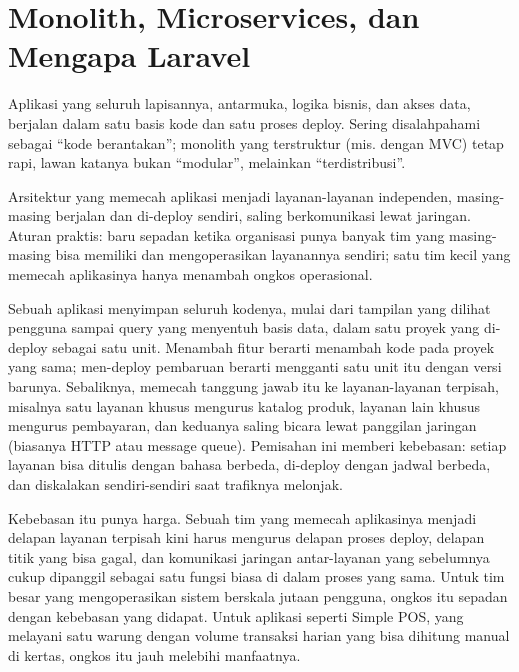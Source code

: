 \section{Monolith, Microservices, dan Mengapa Laravel}
\label{sec:arsitektur-web-modern-1}

\begin{istilahpenting}
\begin{description}[leftmargin=0pt,style=nextline]
  \item[Monolith] Aplikasi yang seluruh lapisannya, antarmuka, logika bisnis, dan akses data, berjalan dalam satu basis kode dan satu proses deploy. Sering disalahpahami sebagai ``kode berantakan''; monolith yang terstruktur (mis. dengan MVC) tetap rapi, lawan katanya bukan ``modular'', melainkan ``terdistribusi''.
  \item[Microservices] Arsitektur yang memecah aplikasi menjadi layanan-layanan independen, masing-masing berjalan dan di-deploy sendiri, saling berkomunikasi lewat jaringan. Aturan praktis: baru sepadan ketika organisasi punya banyak tim yang masing-masing bisa memiliki dan mengoperasikan layanannya sendiri; satu tim kecil yang memecah aplikasinya hanya menambah ongkos operasional.
\end{description}
\end{istilahpenting}

Sebuah aplikasi  menyimpan seluruh kodenya, mulai dari
tampilan yang dilihat pengguna sampai query yang menyentuh basis data, dalam
satu proyek yang di-deploy sebagai satu unit. Menambah fitur berarti
menambah kode pada proyek yang sama; men-deploy pembaruan berarti mengganti
satu unit itu dengan versi barunya. Sebaliknya, 
memecah tanggung jawab itu ke layanan-layanan terpisah, misalnya satu
layanan khusus mengurus katalog produk, layanan lain khusus mengurus
pembayaran, dan keduanya saling bicara lewat panggilan jaringan (biasanya
HTTP atau message queue). Pemisahan ini memberi kebebasan: setiap layanan
bisa ditulis dengan bahasa berbeda, di-deploy dengan jadwal berbeda, dan
diskalakan sendiri-sendiri saat trafiknya melonjak.

Kebebasan itu punya harga. Sebuah tim yang memecah aplikasinya menjadi
delapan layanan terpisah kini harus mengurus delapan proses deploy, delapan
titik yang bisa gagal, dan komunikasi jaringan antar-layanan yang sebelumnya
cukup dipanggil sebagai satu fungsi biasa di dalam proses yang sama. Untuk
tim besar yang mengoperasikan sistem berskala jutaan pengguna, ongkos itu
sepadan dengan kebebasan yang didapat. Untuk aplikasi seperti Simple POS,
yang melayani satu warung dengan volume transaksi harian yang bisa dihitung
manual di kertas, ongkos itu jauh melebihi manfaatnya.

